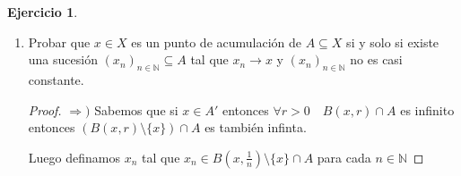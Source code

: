 \documentclass[12pt]{article}
\newcommand{\N}{\mathbb{N}}
\newcommand{\Ra}{\Rightarrow}
\newcommand{\ra}{\rightarrow}
\newcommand{\ol}{\overline}
\theoremstyle{definition}
\newtheorem*{remark}{Observación}
\newtheorem{ej}{Ejercicio}
\begin{document}
\begin{ej}
\begin{enumerate}
\begin{enumerate}
\begin{proof}
      Pero entonces existe $r>0$ tal que $B(x,r) \cap A = \{x\}$, si fuese otro eleménto $y$ el único , usaríamos $r'= \frac{d(x,y)}{2}$ y entonces $y \notin B(x,r')$

      Entonces $x \in A$

      Entonces siempre que $x \in \ol A \Ra x \in A$ o $x \in A'$ por lo tanto $x \in A \cup A' $ 
	  \end{proof}
	\item $(\ol A)' = A'$
	  \begin{proof}
	$\supseteq )$ Usando el b) tenemos que como $A \subseteq \ol A \Ra A' \subseteq (\ol A)'$

      $\subseteq )$ Sea $x \in (\ol A)'$ entonces existe $(x_n)_{n\in \N} \subseteq \ol A \setminus \{x\}= (A \cup A') \setminus \{x\}$ tal que $x_n \ra x$

    Luego $x_{n}$ tiene infinitos términos en $A$ o en $A'$ o en las dos

  Si tiene infinitos en $A$ podemos armar una subsucesión $(x_{n_{j}})_{n\in \N} \subseteq A$ como es subsucesión $x_{n_j} \ra x$ entonces $x \in A'$

Si tiene infinitos en $A'$ similarmente llegamos a que $x \in (A')' \subseteq A'$

Si tiene infinitos en las dos , podemos usar cualquiera de los dos argumentos

\begin{remark}
 $(A')'\subseteq A'$ 
 \begin{proof}
 $A'$ es cerrado por lo tanto para cualquier $(x_{n})_n \subseteq A'$ tal que $x_n \ra x$ sucede que $x \in A'$. Si no , no sería cerrado 

Luego $A'$ contiene a todos sus puntos de acumulación por lo tanto $(A')' \subseteq A'$
 \end{proof} 
\end{remark}
	  \end{proof}
      \end{enumerate}
      \newpage
    \item Probar que $x \in X$ es un punto de acumulación de $A \subseteq X$ si y solo si existe una sucesión $(x_{n})_{n \in \N} \subseteq A$ tal que $x_{n} \ra x$ y $(x_{n})_{n \in \N}$ no es casi constante. 
      \begin{proof}
    $\Ra )$ Sabemos que si $x \in A'$ entonces $\forall r>0 \quad B(x,r) \cap A$ es infinito entonces $(B(x,r)\setminus \{x\}) \cap A$ es también infinta. 

      Luego definamos $x_{n}$ tal que $x_{n} \in B(x,\frac{1}{n}) \setminus \{x\} \cap A$ para cada $n \in \N$


\end{proof}
\end{enumerate}
\end{ej}
\end{document}
